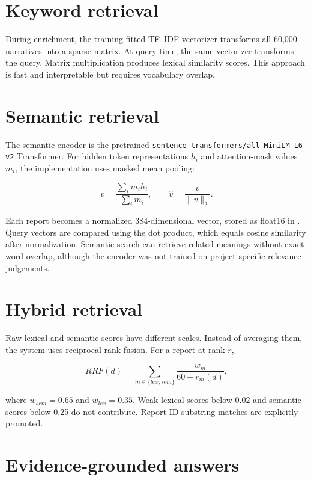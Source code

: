 \documentclass[12pt,a4paper]{report}
\newcommand{\code}[1]{\texttt{#1}}
\begin{document}
\section{Keyword retrieval}

During enrichment, the training-fitted TF--IDF vectorizer transforms all 60,000 narratives into a sparse matrix. At query time, the same vectorizer transforms the query. Matrix multiplication produces lexical similarity scores. This approach is fast and interpretable but requires vocabulary overlap.

\section{Semantic retrieval}

The semantic encoder is the pretrained \code{sentence-transformers/all-MiniLM-L6-v2} Transformer. For hidden token representations $h_i$ and attention-mask values $m_i$, the implementation uses masked mean pooling:

\begin{equation}
v=\frac{\sum_i m_ih_i}{\sum_i m_i},\qquad \hat{v}=\frac{v}{\|v\|_2}.
\end{equation}

Each report becomes a normalized 384-dimensional vector, stored as float16 in . Query vectors are compared using the dot product, which equals cosine similarity after normalization. Semantic search can retrieve related meanings without exact word overlap, although the encoder was not trained on project-specific relevance judgements.

\section{Hybrid retrieval}

Raw lexical and semantic scores have different scales. Instead of averaging them, the system uses reciprocal-rank fusion. For a report at rank $r$,

\begin{equation}
RRF(d)=\sum_{m\in\{lex,sem\}}\frac{w_m}{60+r_m(d)},
\end{equation}

where $w_{sem}=0.65$ and $w_{lex}=0.35$. Weak lexical scores below 0.02 and semantic scores below 0.25 do not contribute. Report-ID substring matches are explicitly promoted.

\section{Evidence-grounded answers}
\end{document}
